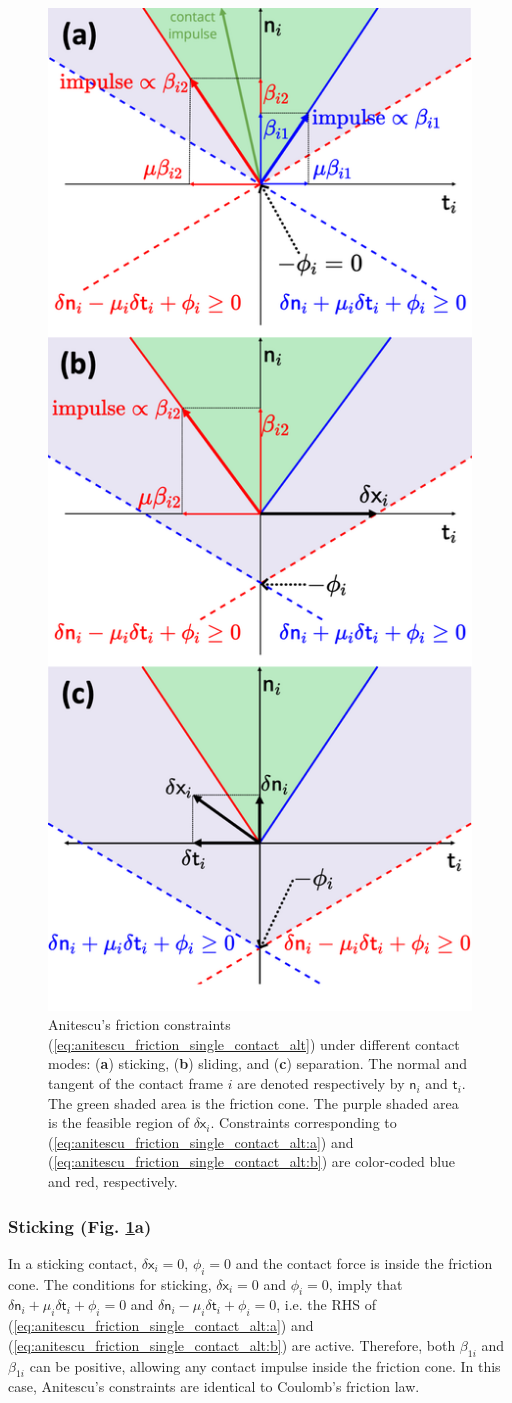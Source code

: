\begin{figure}[ht!]
\centering
\includegraphics[width=0.53\linewidth]{figures/02_quasi_static_dynamics/anitescu_constraints_detailed.png}
\caption{Anitescu's friction constraints (\ref{eq:anitescu_friction_single_contact_alt}) under different contact modes: (\textbf{a}) sticking, (\textbf{b}) sliding, and (\textbf{c}) separation. The normal and tangent of the contact frame $i$ are denoted respectively by $\mathsf{n}_i$ and $\mathsf{t}_i$. The green shaded area is the friction cone. The purple shaded area is the feasible region of $\delta \mathsf{x}_i$. Constraints corresponding to (\ref{eq:anitescu_friction_single_contact_alt:a}) and (\ref{eq:anitescu_friction_single_contact_alt:b}) are color-coded blue and red, respectively.}
\label{fig:anitescu_constraints_detailed}
\end{figure}

\subsubsection{Sticking (Fig. \ref{fig:anitescu_constraints_detailed}a)} In a sticking contact, $\delta \mathsf{x}_i= 0$, $\phi_i = 0$ and the contact force is inside the friction cone. The conditions for sticking, $\delta \mathsf{x}_i= 0$ and $\phi_i = 0$, imply that $ \delta \mathsf{n}_i + \mu_i \delta \mathsf{t}_i + \phi_i = 0$ and $\delta \mathsf{n}_i - \mu_i \delta \mathsf{t}_i + \phi_i = 0$, i.e. the RHS of (\ref{eq:anitescu_friction_single_contact_alt:a}) and (\ref{eq:anitescu_friction_single_contact_alt:b}) are active. Therefore, both $\beta_{1i}$ and $\beta_{1i}$ can be positive, allowing any contact impulse inside the friction cone. In this case, Anitescu's constraints are identical to Coulomb's friction law. 

